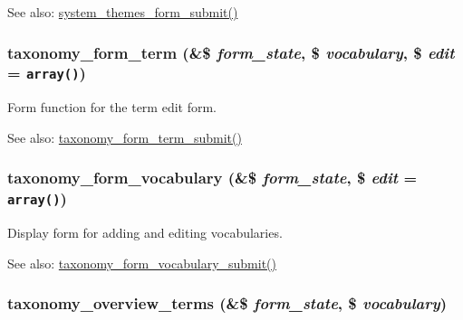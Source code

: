 \begin{Desc}
\item[See also:]\hyperlink{system_8admin_8inc_befe4cab3ed3a80f4d37af3eb74df33f}{system\_\-themes\_\-form\_\-submit()} \end{Desc}
\hypertarget{group__forms_gc57918eae4868ce5e1c8d62c995ae295}{
\subsubsection[{taxonomy\_\-form\_\-term}]{\setlength{\rightskip}{0pt plus 5cm}taxonomy\_\-form\_\-term (\&\$ {\em form\_\-state}, \/  \$ {\em vocabulary}, \/  \$ {\em edit} = {\tt array()})}}
\label{group__forms_gc57918eae4868ce5e1c8d62c995ae295}


Form function for the term edit form.

\begin{Desc}
\item[See also:]\hyperlink{taxonomy_8admin_8inc_47414380bfb0caa70eb3d35a7e153ac0}{taxonomy\_\-form\_\-term\_\-submit()} \end{Desc}
\hypertarget{group__forms_gba5c105f6b3e1a7e85f65fdaa067e0eb}{
\subsubsection[{taxonomy\_\-form\_\-vocabulary}]{\setlength{\rightskip}{0pt plus 5cm}taxonomy\_\-form\_\-vocabulary (\&\$ {\em form\_\-state}, \/  \$ {\em edit} = {\tt array()})}}
\label{group__forms_gba5c105f6b3e1a7e85f65fdaa067e0eb}


Display form for adding and editing vocabularies.

\begin{Desc}
\item[See also:]\hyperlink{taxonomy_8admin_8inc_5fe8d2d826372a29a068cd2c39e38636}{taxonomy\_\-form\_\-vocabulary\_\-submit()} \end{Desc}
\hypertarget{group__forms_g27f78faeeac394ba8359e22501c5b333}{
\subsubsection[{taxonomy\_\-overview\_\-terms}]{\setlength{\rightskip}{0pt plus 5cm}taxonomy\_\-overview\_\-terms (\&\$ {\em form\_\-state}, \/  \$ {\em vocabulary})}}
\label{group__forms_g27f78faeeac394ba8359e22501c5b333}


